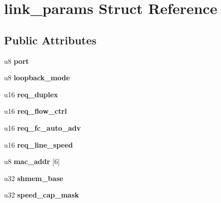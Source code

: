 \hypertarget{structlink__params}{
\section{link\_\-params Struct Reference}
\label{structlink__params}
}
\subsection*{Public Attributes}
\begin{DoxyCompactItemize}
\item 
\hypertarget{structlink__params_a968936987c11450226ba70ba27765074}{
u8 {\bfseries port}}
\label{structlink__params_a968936987c11450226ba70ba27765074}

\item 
\hypertarget{structlink__params_abb86378049bea02152d781286307bab3}{
u8 {\bfseries loopback\_\-mode}}
\label{structlink__params_abb86378049bea02152d781286307bab3}

\item 
\hypertarget{structlink__params_aee48253a9ed21a032744e081ee0e9e17}{
u16 {\bfseries req\_\-duplex}}
\label{structlink__params_aee48253a9ed21a032744e081ee0e9e17}

\item 
\hypertarget{structlink__params_a3302a707e0d6cfcedc21eb88c0b7902a}{
u16 {\bfseries req\_\-flow\_\-ctrl}}
\label{structlink__params_a3302a707e0d6cfcedc21eb88c0b7902a}

\item 
\hypertarget{structlink__params_a96b3f12554eafcdc347b7ed66bf02e64}{
u16 {\bfseries req\_\-fc\_\-auto\_\-adv}}
\label{structlink__params_a96b3f12554eafcdc347b7ed66bf02e64}

\item 
\hypertarget{structlink__params_a22b056acbcd852d074feed90696a532a}{
u16 {\bfseries req\_\-line\_\-speed}}
\label{structlink__params_a22b056acbcd852d074feed90696a532a}

\item 
\hypertarget{structlink__params_add440ccba3a4116f3b0df92b5bc8d455}{
u8 {\bfseries mac\_\-addr} \mbox{[}6\mbox{]}}
\label{structlink__params_add440ccba3a4116f3b0df92b5bc8d455}

\item 
\hypertarget{structlink__params_ae15c1b13c8624a2f7f00da1ffcf326a6}{
u32 {\bfseries shmem\_\-base}}
\label{structlink__params_ae15c1b13c8624a2f7f00da1ffcf326a6}

\item 
\hypertarget{structlink__params_a16e4d234e18cdacbb849e58d95843122}{
u32 {\bfseries speed\_\-cap\_\-mask}}
\label{structlink__params_a16e4d234e18cdacbb849e58d95843122}


\end{DoxyCompactItemize}
